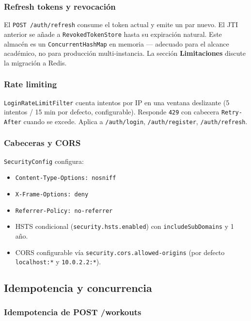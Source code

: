 \documentclass[11pt,a4paper]{article}
\newcommand{\cls}[1]{\texttt{\small #1}}
\begin{document}
\subsubsection{Refresh tokens y revocación}

El \texttt{POST /auth/refresh} consume el token actual y emite un par nuevo. El JTI anterior se añade a \cls{RevokedTokenStore} hasta su expiración natural. Este almacén es un \texttt{ConcurrentHashMap} en memoria — adecuado para el alcance académico, no para producción multi-instancia. La sección \textbf{Limitaciones} discute la migración a Redis.

\subsubsection{Rate limiting}

\cls{LoginRateLimitFilter} cuenta intentos por IP en una ventana deslizante (5 intentos / 15 min por defecto, configurable). Responde \texttt{429} con cabecera \texttt{Retry-After} cuando se excede. Aplica a \texttt{/auth/login}, \texttt{/auth/register}, \texttt{/auth/refresh}.

\subsubsection{Cabeceras y CORS}

\cls{SecurityConfig} configura:
\begin{itemize}[leftmargin=*]
  \item \texttt{Content-Type-Options: nosniff}
  \item \texttt{X-Frame-Options: deny}
  \item \texttt{Referrer-Policy: no-referrer}
  \item HSTS condicional (\texttt{security.hsts.enabled}) con \texttt{includeSubDomains} y 1 año.
  \item CORS configurable vía \texttt{security.cors.allowed-origins} (por defecto \texttt{localhost:*} y \texttt{10.0.2.2:*}).
\end{itemize}

\subsection{Idempotencia y concurrencia}

\subsubsection{Idempotencia de POST /workouts}
\end{document}
